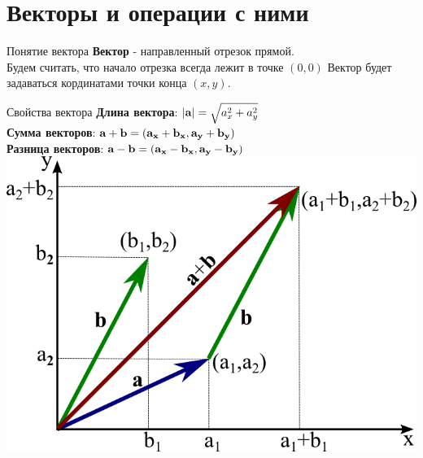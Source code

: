 \documentclass{beamer}
\begin{document}
\section{Векторы и операции с ними}
\begin{frame}{Понятие вектора}
    \textbf{Вектор} - 
     направленный отрезок прямой.\\
     Будем считать, что начало отрезка всегда лежит в точке $(0,0)$
     Вектор будет задаваться кординатами точки конца $(x, y)$.
\end{frame}
\begin{frame}{Свойства вектора}
    \textbf{Длина вектора}: $\left|\bf{a}\right| = \sqrt{a_{x}^{2} + a_{y}^{2}}$ \\
    \textbf{Сумма векторов}: $\bf{a} + \bf{b} = (a_{x} + b_{x}, a_{y} + b_{y})$\\
    \textbf{Разница векторов}: $\bf{a} - \bf{b} = (a_x - b_x, a_y - b_y)$
    \includegraphics[scale = 0.6]{vector_2d_add.png}
\end{frame}
\end{document}
